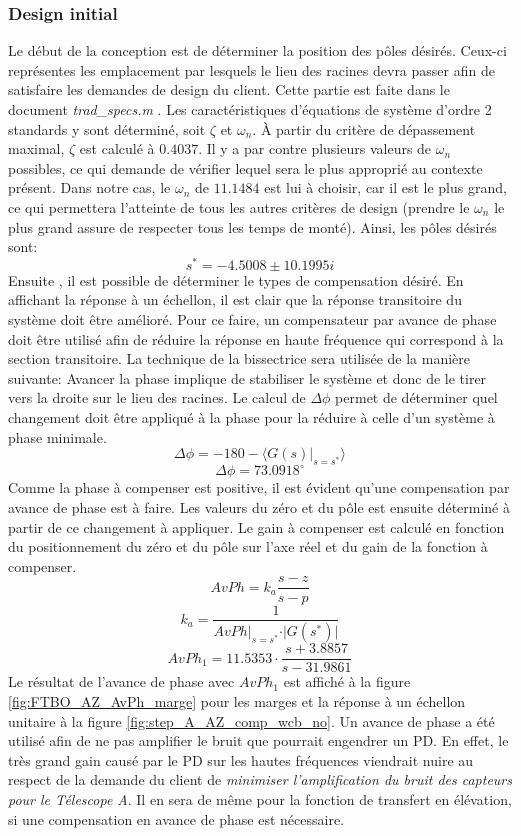\documentclass{udes_rapport} %
\begin{document}
\subsubsection{Design initial}
Le début de la conception est de déterminer la position des pôles désirés. Ceux-ci représentes les emplacement par lesquels le lieu des racines devra passer afin de satisfaire les demandes de design du client. Cette partie est faite dans le document \textit{trad\_specs.m} . Les caractéristiques d'équations de système d'ordre 2 standards y sont déterminé, soit $\zeta$ et $\omega _{n}$. À partir du critère de dépassement maximal, $\zeta$ est calculé à $0.4037$. Il y a par contre plusieurs valeurs de $\omega _{n}$ possibles, ce qui demande de vérifier lequel sera le plus approprié au contexte présent. Dans notre cas, le $\omega _{n}$ de $11.1484$ est lui à choisir, car il est le plus grand, ce qui permettera l'atteinte de tous les autres critères de design (prendre le $\omega _{n}$ le plus grand assure de respecter tous les temps de monté). Ainsi, les pôles désirés sont:
\[s^* = -4.5008\pm 10.1995i\]
Ensuite , il est possible de déterminer le types de compensation désiré. En affichant la réponse à un échellon, il est clair que la réponse transitoire du système doit être amélioré. Pour ce faire, un compensateur par avance de phase doit être utilisé afin de réduire la réponse en haute fréquence qui correspond à la section transitoire. La technique de la bissectrice sera utilisée de la manière suivante:
Avancer la phase implique de stabiliser le système et donc de le tirer vers la droite sur le lieu des racines. Le calcul de $\Delta \phi$ permet de déterminer quel changement doit être appliqué à la phase pour la réduire à celle d'un système à phase minimale.
\[\Delta \phi = -180 - \langle G(s)\vert_{s = s^*} \rangle\]
\[\Delta \phi = 73.0918^\circ \]
Comme la phase à compenser est positive, il est évident qu'une compensation par avance de phase est à faire. Les valeurs du zéro et du pôle est ensuite déterminé à partir de ce changement à appliquer. Le gain à compenser est calculé en fonction du positionnement du zéro et du pôle sur l'axe réel et du gain de la fonction à compenser.
\[AvPh = k_a\frac{s-z}{s-p}\]
\[k_a = \frac{1}{AvPh \vert_{s = s^*} \cdot \vert G(s^*)  \vert } \]
\[AvPh_1 = 11.5353 \cdot \frac{s+3.8857}{s-31.9861}\]
Le résultat de l'avance de phase avec $AvPh_1$ est affiché à la  figure \ref{fig:FTBO_AZ_AvPh_marge} pour les marges et la réponse à un échellon unitaire à la figure \ref{fig:step_A_AZ_comp_wcb_no}.
Un avance de phase a été utilisé afin de ne pas amplifier le bruit que pourrait engendrer un PD. En effet, le très grand gain causé par le PD sur les hautes fréquences viendrait nuire au respect de la demande du client de \textit{minimiser l’amplification du bruit des capteurs pour le Télescope A}. Il en sera de même pour la fonction de transfert en élévation, si une compensation en avance de phase est nécessaire.
\end{document}
